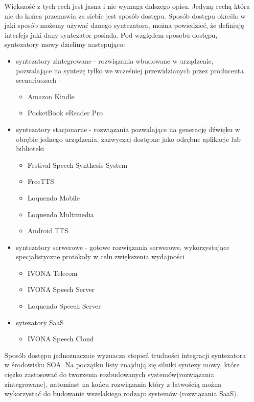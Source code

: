 Większość z tych cech jest jasna i nie wymaga dalszego opisu. Jedyną cechą która nie do końca przemawia za siebie jest sposób dostępu. Sposób dostępu określa w jaki sposób możemy używać danego syntezatora, można powiedzieć, że definiuję interfejs jaki dany syntezator posiada. Pod względem sposobu dostępu, syntezatory mowy dzielimy następująco:

\begin{itemize}
	\item syntezatory zintegrowane  - rozwiązania wbudowane w urządzenie, pozwalające na syntezę tylko we wcześniej przewidzianych przez producenta scenariuszach - 
		\begin{itemize}
			\item  Amazon Kindle
			\item  PocketBook eReader Pro
		\end{itemize}
	\item syntezatory stacjonarne - rozwiązania pozwalające na generację dźwięku w obrębie jednego urządzenia, zazwyczaj dostępne jako odrębne aplikacje lub biblioteki
		\begin{itemize}
			\item Festival Speech Synthesis System
			\item FreeTTS
			\item Loquendo Mobile
			\item Loquendo Multimedia
			\item Android TTS
		\end{itemize}
	\item syntezatory serwerowe - gotowe rozwiązania serwerowe, wykorzystujące specjalistyczne protokoły w celu zwiększenia wydajności 
		\begin{itemize}
			\item IVONA Telecom
			\item IVONA Speech Server
			\item Loquendo Speech Server
		\end{itemize}
	\item sytezatory SaaS
		\begin{itemize}
			\item IVONA Speech Cloud
		\end{itemize}
\end{itemize}

Sposób dostępu jednoznacznie wyznacza stopień trudności integracji syntezatora w środowisku SOA. Na początku listy znajdują się silniki syntezy mowy, które ciężko zastosować do tworzenia rozbudowanych systemów(rozwiązania zintegrowane), natomiast na końcu rozwiązania który z łatwością można wykorzystać do budowanie wszelakiego rodzaju systemów (rozwiązania SaaS).

